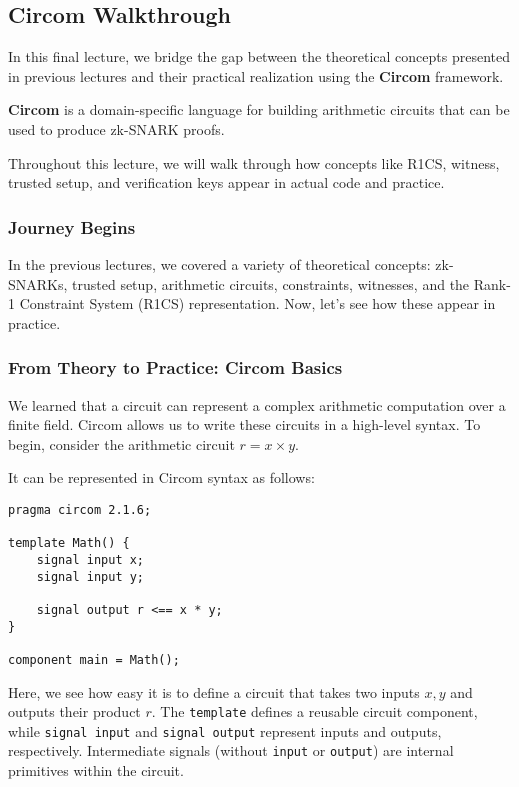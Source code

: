 \documentclass[../lecture-notes.tex]{subfiles}
\begin{document}
    \subsection{Circom Walkthrough}

    In this final lecture, we bridge the gap between the theoretical concepts presented in previous lectures and their practical realization using the \textbf{Circom} framework.

    \begin{definition}
        \textbf{Circom} is a domain-specific language for building arithmetic circuits that can be used to produce zk-SNARK proofs.
    \end{definition}

    Throughout this lecture, we will walk through how concepts like R1CS, witness, trusted setup, and verification keys appear in actual code and practice.

    \subsubsection{Journey Begins}

    In the previous lectures, we covered a variety of theoretical concepts: zk-SNARKs, trusted setup, arithmetic circuits, constraints, witnesses, and the Rank-1 Constraint System (R1CS) representation.
    Now, let's see how these appear in practice.

    \subsubsection{From Theory to Practice: Circom Basics}

    We learned that a circuit can represent a complex arithmetic computation over a finite field.
    Circom allows us to write these circuits in a high-level syntax.
    To begin, consider the arithmetic circuit $r = x \times y$.

    It can be represented in Circom syntax as follows:

    \begin{lstlisting}[language=Circom,numbers=none]
pragma circom 2.1.6;

template Math() {
    signal input x;
    signal input y;

    signal output r <== x * y;
}

component main = Math();
    \end{lstlisting}

    Here, we see how easy it is to define a circuit that takes two inputs $x,y$ and outputs their product $r$.
    The \texttt{template} defines a reusable circuit component, while \texttt{signal input} and \texttt{signal output} represent inputs and outputs, respectively.
    Intermediate signals (without \texttt{input} or \texttt{output}) are internal primitives within the circuit.
\end{document}
